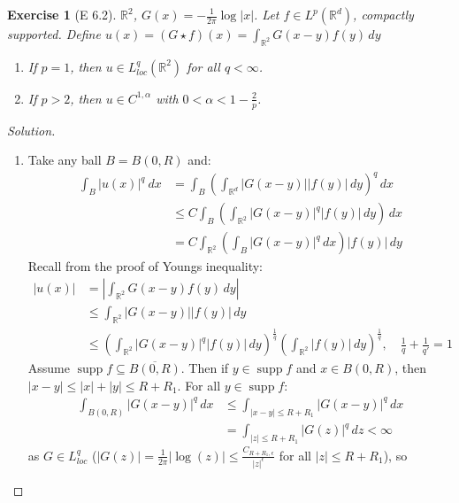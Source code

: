 \documentclass{report}
\theoremstyle{tommy}
\newtheorem{ex}[defn]{Exercise}
\newcommand{\supp}{\operatorname{supp}}
\begin{document}
  \begin{ex}[E 6.2]
    \(\mathbb{R}^2\), \(G(x) = - \frac{1}{2 \pi} \log |x|\). Let \(f \in L^p(\mathbb{R}^d)\), compactly supported. Define \(u(x) =(G \star f)(x) = \int_{\mathbb{R}^2} G(x-y) f(y) \, dy\)
    \begin{enumerate}
      \item If \(p = 1\), then \(u \in L_{loc}^q(\mathbb{R}^2)\) for all \(q < \infty\).
      \item If \(p > 2\), then \(u \in C^{1, \alpha}\) with \(0 < \alpha < 1 - \frac{2}{p}\).
    \end{enumerate}
  \end{ex}

  \begin{proof}[Solution]
    \begin{enumerate}
      \item Take any ball \(B = B(0,R)\) and:
      \begin{align*}
        \int_B |u(x)|^q \ dx 
        &= \int_B \left(\int_{\mathbb{R}^d} |G(x-y)| |f(y)| \, dy\right)^q \, dx \\
        &\le C \int_{B} \left(\int_{\mathbb{R}^2} |G(x-y)|^q |f(y)| \, dy\right) \, dx  \\
        &= C \int_{\mathbb{R}^2} \left(\int_B |G(x-y)|^q \, dx\right) |f(y)| \, dy
      \end{align*}
      Recall from the proof of Youngs inequality:
      \begin{align*}
        |u(x)| &= \left| \int_{\mathbb{R}^2} G(x-y) f(y) \, dy \right| \\
        &\le \int_{\mathbb{R}^2} |G(x-y)||f(y)| \, dy \\
        &\le \left(\int_{\mathbb{R}^2} |G(x-y)|^q |f(y)| \, dy\right)^{\frac{1}{q}} \left(\int_{\mathbb{R}^2} |f(y)| \, dy\right)^{\frac{1}{q}}, \quad \frac{1}{q} + \frac{1}{q'} = 1
      \end{align*}
      Assume \(\supp f \subseteq \overline{B(0, R)}\). Then if \(y \in \supp f\) and \(x \in B(0,R)\), then \(|x-y| \le |x| + |y| \le R + R_1\). For all \(y \in \supp f\):
      \begin{align*}
        \int_{B(0, R)} |G(x-y)|^q \, dx
        &\le \int_{|x-y| \le R + R_1} |G(x-y)|^q \, dx \\
        &= \int_{|z| \le R + R_1} |G(z)|^q \, dz < \infty
      \end{align*}
      as \(G \in L_{loc}^q\) (\(|G(z)| = \frac{1}{2 \pi} |\log(z)| \le \frac{C_{R + R_1, \epsilon}}{|z|^\epsilon}\) for all \(|z| \le R + R_1\)), so 

\end{enumerate}
\end{proof}
\end{document}
